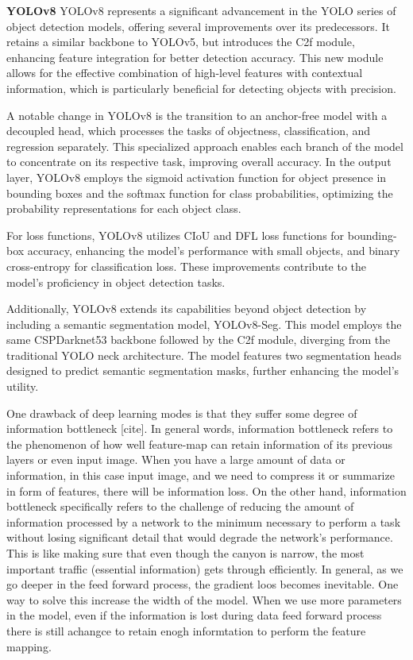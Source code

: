 \textbf{YOLOv8} \cite{ultralyticsYOLOv8} YOLOv8 represents a significant advancement in the YOLO series of object detection models, offering several improvements over its predecessors. It retains a similar backbone to YOLOv5, but introduces the C2f module, enhancing feature integration for better detection accuracy. This new module allows for the effective combination of high-level features with contextual information, which is particularly beneficial for detecting objects with precision.

A notable change in YOLOv8 is the transition to an anchor-free model with a decoupled head, which processes the tasks of objectness, classification, and regression separately. This specialized approach enables each branch of the model to concentrate on its respective task, improving overall accuracy. In the output layer, YOLOv8 employs the sigmoid activation function for object presence in bounding boxes and the softmax function for class probabilities, optimizing the probability representations for each object class.

For loss functions, YOLOv8 utilizes CIoU and DFL loss functions for bounding-box accuracy, enhancing the model's performance with small objects, and binary cross-entropy for classification loss. These improvements contribute to the model's proficiency in object detection tasks.

Additionally, YOLOv8 extends its capabilities beyond object detection by including a semantic segmentation model, YOLOv8-Seg. This model employs the same CSPDarknet53 backbone followed by the C2f module, diverging from the traditional YOLO neck architecture. The model features two segmentation heads designed to predict semantic segmentation masks, further enhancing the model's utility.




One  drawback of deep learning modes is that they suffer some degree of information bottleneck [cite]. In general words, information bottleneck refers to the phenomenon of how well feature-map can retain information of its previous layers or even input image. When you have a large amount of data or information, in this case input image, and we need to compress it or summarize in form of features, there will be information loss. On the other hand, information bottleneck specifically refers to the challenge of reducing the amount of information processed by a network to the minimum necessary to perform a task without losing significant detail that would degrade the network's performance. This is like making sure that even though the canyon is narrow, the most important traffic (essential information) gets through efficiently. In general, as we go deeper in the feed forward process, the gradient loos becomes inevitable. One way to solve this increase the width of the model. When we use more parameters in the model, even if the information is lost during data feed forward process there is still achangce to retain enogh informtation to perform the feature mapping. 

